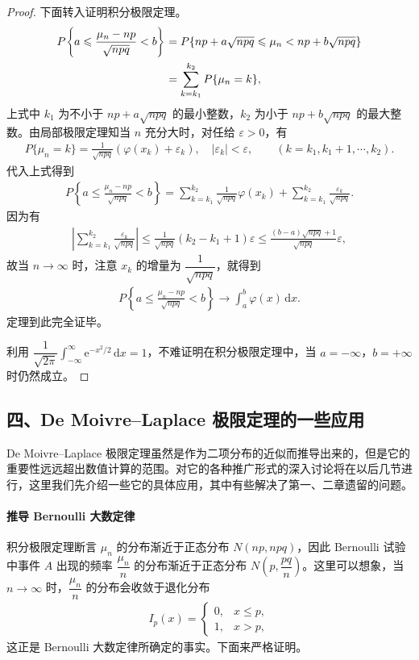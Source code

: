 \documentclass[../../main.tex]{subfiles}
\begin{document}
\begin{proof}
下面转入证明积分极限定理。
\begin{align}
P\!\left\{a\leqslant\frac{\mu_n-np}{\sqrt{npq}}<b\right\}
&=P\{np+a\sqrt{npq}\leqslant\mu_n<np+b\sqrt{npq}\}\notag\\
&=\sum_{k=k_1}^{k_2}P\{\mu_n=k\},
\end{align}
上式中 $k_1$ 为不小于 $np+a\sqrt{npq}$ 的最小整数，$k_2$ 为小于 $np+b\sqrt{npq}$ 的最大整数。由局部极限定理知当 $n$ 充分大时，对任给 $\varepsilon>0$，有
\begin{align*}
P\{\mu_n=k\}=\frac{1}{\sqrt{npq}}(\varphi(x_k)+\varepsilon_k),\quad |\varepsilon_k|<\varepsilon,\qquad (k=k_1,k_1+1,\cdots,k_2).
\end{align*}
代入上式得到
\begin{align*}
P\!\left\{a\leqslant\frac{\mu_n-np}{\sqrt{npq}}<b\right\}
=\sum_{k=k_1}^{k_2}\frac{1}{\sqrt{npq}}\varphi(x_k)+\sum_{k=k_1}^{k_2}\frac{\varepsilon_k}{\sqrt{npq}}.
\end{align*}
因为有
\begin{align*}
\left|\sum_{k=k_1}^{k_2}\frac{\varepsilon_k}{\sqrt{npq}}\right|
\leqslant\frac{1}{\sqrt{npq}}(k_2-k_1+1)\varepsilon
\leqslant\frac{(b-a)\sqrt{npq}+1}{\sqrt{npq}}\varepsilon,
\end{align*}
故当 $n\to\infty$ 时，注意 $x_k$ 的增量为 $\dfrac{1}{\sqrt{npq}}$，就得到
\begin{align*}
P\!\left\{a\leqslant\frac{\mu_n-np}{\sqrt{npq}}<b\right\}\to\int_{a}^{b}\varphi(x)\,\mathrm{d}x.
\end{align*}
定理到此完全证毕。

利用 $\dfrac{1}{\sqrt{2\pi}}\int_{-\infty}^{\infty}\mathrm{e}^{-x^{2}/2}\,\mathrm{d}x=1$，不难证明在积分极限定理中，当 $a=-\infty$，$b=+\infty$ 时仍然成立。
\end{proof}

\subsection*{四、De Moivre--Laplace 极限定理的一些应用}

De Moivre--Laplace 极限定理虽然是作为二项分布的近似而推导出来的，但是它的重要性远远超出数值计算的范围。对它的各种推广形式的深入讨论将在以后几节进行，这里我们先介绍一些它的具体应用，其中有些解决了第一、二章遗留的问题。

\paragraph*{推导 Bernoulli 大数定律}
积分极限定理断言 $\mu_n$ 的分布渐近于正态分布 $N(np,npq)$，因此 Bernoulli 试验中事件 $A$ 出现的频率 $\dfrac{\mu_n}{n}$ 的分布渐近于正态分布 $N\!\left(p,\dfrac{pq}{n}\right)$。这里可以想象，当 $n\to\infty$ 时，$\dfrac{\mu_n}{n}$ 的分布会收敛于退化分布
\begin{align*}
I_p(x)=
\begin{cases}
0,&x\leqslant p,\\
1,&x>p,
\end{cases}
\end{align*}
这正是 Bernoulli 大数定律所确定的事实。下面来严格证明。
\end{document}
